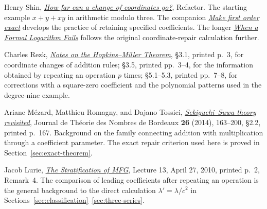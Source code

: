 \documentclass[11pt,letterpaper]{article}
\numberwithin{equation}{section}
\theoremstyle{definition}\newtheorem{example}[theorem]{Example}
\begin{document}
\begin{enumerate}[leftmargin=*,label={[\arabic*]},itemsep=.65em]
\item Henry Shin, \href{https://refactor.press/refactors/coordinate-repair}{\emph{How far can a change of coordinates go?}}, Refactor. The starting example \(x+y+xy\) in arithmetic modulo three. The companion \href{https://refactor.press/refactors/first-order}{\emph{Make first order exact}} develops the practice of retaining specified coefficients. The longer \href{https://refactor.press/notes/when-a-formal-logarithm-fails}{\emph{When a Formal Logarithm Fails}} follows the original coordinate-repair calculation further.

\item Charles Rezk, \href{https://www.sas.rochester.edu/mth/sites/doug-ravenel/otherpapers/hopkins-miller-thm.pdf}{\emph{Notes on the Hopkins--Miller Theorem}}, \S3.1, printed p.~3, for coordinate changes of addition rules; \S3.5, printed pp.~3--4, for the information obtained by repeating an operation \(p\) times; \S5.1--5.3, printed pp.~7--8, for corrections with a square-zero coefficient and the polynomial patterns used in the degree-nine example.

\item Ariane M\'ezard, Matthieu Romagny, and Dajano Tossici, \href{https://www.numdam.org/item/10.5802/jtnb.863.pdf}{\emph{Sekiguchi--Suwa theory revisited}}, Journal de Th\'eorie des Nombres de Bordeaux \textbf{26} (2014), 163--200, \S2.2, printed p.~167. Background on the family connecting addition with multiplication through a coefficient parameter. The exact repair criterion used here is proved in Section~\ref{sec:exact-theorem}.

\item Jacob Lurie, \href{https://www.math.ias.edu/~lurie/252xnotes/Lecture13.pdf}{\emph{The Stratification of MFG}}, Lecture 13, April 27, 2010, printed p.~2, Remark~4. The comparison of leading coefficients after repeating an operation is the general background to the direct calculation \(\lambda'=\lambda/c^2\) in Sections~\ref{sec:classification}--\ref{sec:three-series}.
\end{enumerate}

\end{document}
